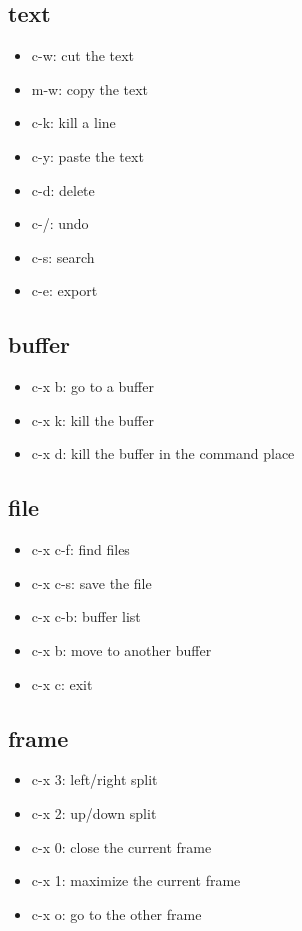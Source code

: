\documentclass[11pt]{article}
\begin{document}
\subsection{text}
\label{sec:org550fcce}
\begin{itemize}
\item c-w: cut the text
\item m-w: copy the text
\item c-k: kill a line
\item c-y: paste the text
\item c-d: delete
\item c-/: undo
\item c-s: search
\item c-e: export
\end{itemize}
\subsection{buffer}
\label{sec:orga44919a}
\begin{itemize}
\item c-x b: go to a buffer
\item c-x k: kill the buffer
\item c-x d: kill the buffer in the command place
\end{itemize}
\subsection{file}
\label{sec:org59d0d96}
\begin{itemize}
\item c-x c-f: find files
\item c-x c-s: save the file
\item c-x c-b: buffer list
\item c-x b: move to another buffer
\item c-x c: exit
\end{itemize}
\subsection{frame}
\label{sec:org697aad3}
\begin{itemize}
\item c-x 3: left/right split
\item c-x 2: up/down split
\item c-x 0: close the current frame
\item c-x 1: maximize the current frame
\item c-x o: go to the other frame
\end{itemize}
\end{document}
